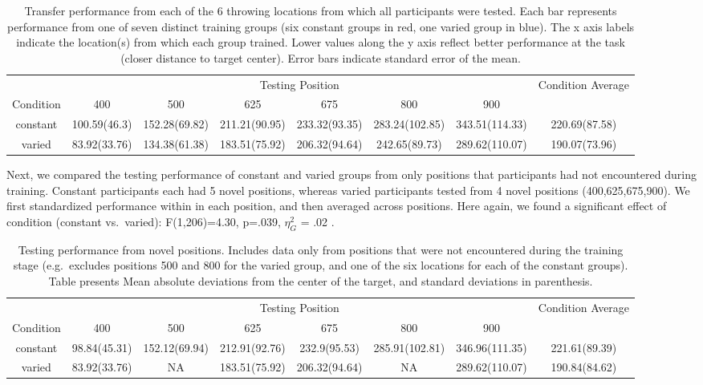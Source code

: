 \documentclass[
  man,floatsintext]{apa7}
\begin{document}
\begin{table}

\caption{\label{tab:e2table1}Transfer performance from each of the 6 throwing locations from which all participants were tested. Each bar represents performance from one of seven distinct training groups (six constant groups in red, one varied group in blue). The x axis labels indicate the location(s) from which each group trained. Lower values along the y axis reflect better performance at the task (closer distance to target center). Error bars indicate standard error of the mean.}
\centering
\begin{tabular}[t]{c|c|c|c|c|c|c|c}
\hline
\multicolumn{1}{c|}{} & \multicolumn{6}{c|}{Testing Position} & \multicolumn{1}{c}{Condition Average} \\
\cline{2-7} \cline{8-8}
Condition & 400 & 500 & 625 & 675 & 800 & 900 & \\
\hline
constant & 100.59(46.3) & 152.28(69.82) & 211.21(90.95) & 233.32(93.35) & 283.24(102.85) & 343.51(114.33) & 220.69(87.58)\\
\hline
varied & 83.92(33.76) & 134.38(61.38) & 183.51(75.92) & 206.32(94.64) & 242.65(89.73) & 289.62(110.07) & 190.07(73.96)\\
\hline
\end{tabular}
\end{table}

Next, we compared the testing performance of constant and varied groups from only positions that participants had not encountered during training. Constant participants each had 5 novel positions, whereas varied participants tested from 4 novel positions (400,625,675,900). We first standardized performance within in each position, and then averaged across positions. Here again, we found a significant effect of condition (constant vs.~varied): F(1,206)=4.30, p=.039, \(\eta^{2}_G\) = .02 .



\begin{table}

\caption{\label{tab:e2table3}Testing performance from novel positions. Includes data only from positions that were not encountered during the training stage (e.g.~excludes positions 500 and 800 for the varied group, and one of the six locations for each of the constant groups). Table presents Mean absolute deviations from the center of the target, and standard deviations in parenthesis.}
\centering
\begin{tabular}[t]{c|c|c|c|c|c|c|c}
\hline
\multicolumn{1}{c|}{} & \multicolumn{6}{c|}{Testing Position} & \multicolumn{1}{c}{Condition Average} \\
\cline{2-7} \cline{8-8}
Condition & 400 & 500 & 625 & 675 & 800 & 900 & \\
\hline
constant & 98.84(45.31) & 152.12(69.94) & 212.91(92.76) & 232.9(95.53) & 285.91(102.81) & 346.96(111.35) & 221.61(89.39)\\
\hline
varied & 83.92(33.76) & NA & 183.51(75.92) & 206.32(94.64) & NA & 289.62(110.07) & 190.84(84.62)\\
\hline
\end{tabular}
\end{table}
\end{document}
